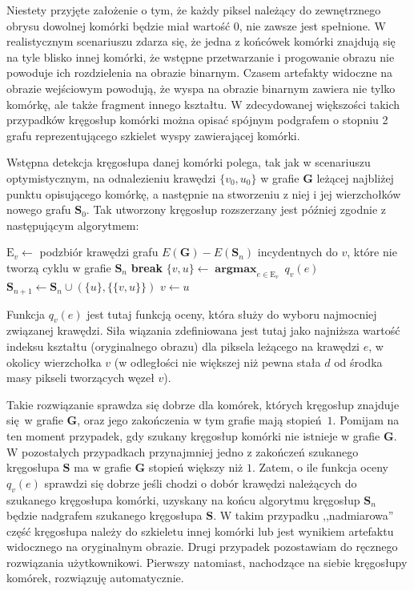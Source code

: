 \documentclass[declaration,shortabstract,mgr]{iithesis}
\DeclareMathOperator*{\argmax}{\textbf{argmax}}
\begin{document}
Niestety przyjęte założenie o tym, że każdy piksel należący do zewnętrznego obrysu dowolnej komórki będzie miał wartość $0$, nie zawsze jest spełnione. W realistycznym scenariuszu zdarza się, że jedna z końcówek komórki znajdują się na tyle blisko innej komórki, że wstępne przetwarzanie i progowanie obrazu nie powoduje ich rozdzielenia na obrazie binarnym. Czasem artefakty widoczne na obrazie wejściowym powodują, że wyspa na obrazie binarnym zawiera nie tylko komórkę, ale także fragment innego kształtu. W zdecydowanej większości takich przypadków kręgosłup komórki można opisać spójnym podgrafem o stopniu 2 grafu reprezentującego szkielet wyspy zawierającej komórki.

Wstępna detekcja kręgosłupa danej komórki polega, tak jak w scenariuszu optymistycznym, na odnalezieniu krawędzi $\{v_0, u_0\}$ w grafie $\mathbf{G}$ leżącej najbliżej punktu opisującego komórkę, a następnie na stworzeniu z niej i jej wierzchołków nowego grafu $\mathbf{S}_0$. Tak utworzony kręgosłup rozszerzany jest później zgodnie z następującym algorytmem:

\begin{algorithm}[H]
\begin{algorithmic}
  \LOOP
    \STATE
      $\text{E}_v \gets$ podzbiór krawędzi grafu $E(\mathbf{G}) - E(\mathbf{S}_n)$ incydentnych do $v$,\newline
       które nie tworzą cyklu w grafie $\mathbf{S}_n$
      \STATE \textbf{break}
    \ENDIF
    \STATE $\{v, u\} \gets \argmax_{e \in \text{E}_v} \ q_v(e)$
    \STATE $\mathbf{S}_{n+1} \gets \mathbf{S}_n \cup (\{u\}, \{\{v, u\}\}) $
    \STATE $v \gets u$
  \ENDLOOP
\ENDFOR
\end{algorithmic}
\end{algorithm}

\noindent
Funkcja $q_v(e)$ jest tutaj funkcją oceny, która służy do wyboru najmocniej związanej krawędzi. Siła wiązania zdefiniowana jest tutaj jako najniższa wartość indeksu kształtu (oryginalnego obrazu) dla piksela leżącego na krawędzi $e$, w okolicy wierzchołka $v$ (w odległości nie większej niż pewna stała $d$ od środka masy pikseli tworzących węzeł $v$).

Takie rozwiązanie sprawdza się dobrze dla komórek, których kręgosłup znajduje się w grafie $\mathbf{G}$, oraz jego zakończenia w tym grafie mają stopień $1$. Pomijam na ten moment przypadek, gdy szukany kręgosłup komórki nie istnieje w grafie $\mathbf{G}$. W pozostałych przypadkach przynajmniej jedno z zakończeń szukanego kręgosłupa $\mathbf{S}$ ma w grafie $\mathbf{G}$ stopień większy niż $1$. Zatem, o ile funkcja oceny $q_v(e)$ sprawdzi się dobrze jeśli chodzi o dobór krawędzi należących do szukanego kręgosłupa komórki, uzyskany na końcu algorytmu kręgosłup $\mathbf{S}_n$ będzie nadgrafem szukanego kręgosłupa $\mathbf{S}$. W takim przypadku ,,nadmiarowa'' część kręgosłupa należy do szkieletu innej komórki lub jest wynikiem artefaktu widocznego na oryginalnym obrazie. Drugi przypadek pozostawiam do ręcznego rozwiązania użytkownikowi. Pierwszy natomiast, nachodzące na siebie kręgosłupy komórek, rozwiązuję automatycznie.
\end{document}
